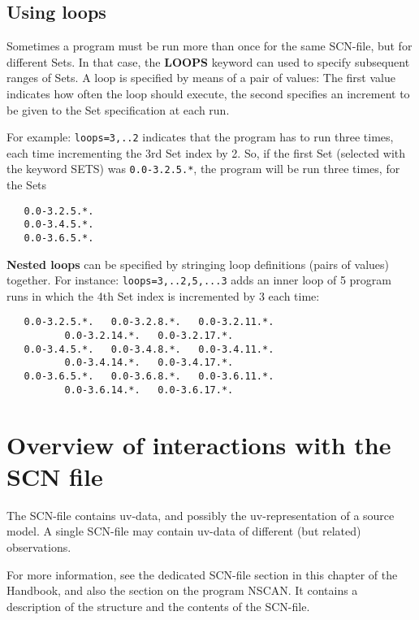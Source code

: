 \subsection{Using loops} 
\label{loops} 

	Sometimes a program must be run more than once for the same 
SCN-file, but for different Sets.  In that case, the {\bf LOOPS} keyword can
used to specify subsequent ranges of Sets.  A loop is specified by means of a
pair of values: The first value indicates how often the loop should execute,
the second specifies an increment to be given to the Set specification at each
run. 

	For example: {\tt loops=3,..2} indicates that the program has to run
three times, each time incrementing the 3rd Set index by 2.  So, if the first
Set (selected with the keyword SETS) was {\tt 0.0-3.2.5.*}, the program will be
run three times, for the Sets 

\begin{verbatim} 
   0.0-3.2.5.*.
   0.0-3.4.5.*.
   0.0-3.6.5.*.
\end{verbatim} 

{\bf Nested loops} can be specified by stringing loop definitions (pairs of
values) together.  For instance: {\tt loops=3,..2,5,...3} adds an inner loop of
5 program runs in which the 4th Set index is incremented by 3 each time: 

\begin{verbatim} 
   0.0-3.2.5.*.   0.0-3.2.8.*.   0.0-3.2.11.*.
		  0.0-3.2.14.*.   0.0-3.2.17.*.
   0.0-3.4.5.*.   0.0-3.4.8.*.   0.0-3.4.11.*.
		  0.0-3.4.14.*.   0.0-3.4.17.*.
   0.0-3.6.5.*.   0.0-3.6.8.*.   0.0-3.6.11.*.
		  0.0-3.6.14.*.   0.0-3.6.17.*.
\end{verbatim} 


\section{Overview of interactions with the SCN file} 
\label{scn} 

	The SCN-file contains uv-data, and possibly the uv-representation of a
source model.  A single SCN-file may contain uv-data of different (but related)
observations. 

	For more information, see the dedicated SCN-file section in this
chapter of the Handbook, and also the section on the program NSCAN.  It
contains a description of the structure and the contents of the 
SCN-file. 



